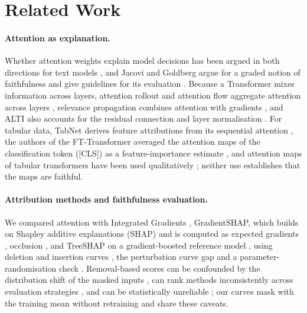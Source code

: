 \section{Related Work}
\label{sec:related}

\paragraph{Attention as explanation.}
Whether attention weights explain model decisions has been argued in both directions for text models
\cite{jain2019,wiegreffe2019,serrano2019}, and Jacovi and Goldberg argue for a graded notion of faithfulness and give
guidelines for its evaluation \cite{jacovi2020}.
Because a Transformer mixes information across layers, attention rollout and attention flow aggregate attention across
layers \cite{abnar2020}, relevance propagation combines attention with gradients \cite{chefer2021}, and ALTI also
accounts for the residual connection and layer normalisation \cite{ferrando2022}.
For tabular data, TabNet derives feature attributions from its sequential attention \cite{arik2021}, the authors of the
FT-Transformer averaged the attention maps of the classification token ([CLS]) as a feature-importance estimate
\cite{gorishniy2021}, and attention maps of tabular transformers have been used qualitatively \cite{somepalli2021};
neither use establishes that the maps are faithful.

\paragraph{Attribution methods and faithfulness evaluation.}
We compared attention with Integrated Gradients \cite{sundararajan2017}, GradientSHAP, which builds on Shapley additive explanations (SHAP) \cite{lundberg2017} and is computed as expected gradients \cite{erion2021},
occlusion \cite{zeiler2014}, and TreeSHAP on a gradient-boosted reference model \cite{lundberg2020}, using deletion and
insertion curves \cite{petsiuk2018,samek2017}, the perturbation curve gap \cite{samek2017} and a parameter-randomisation
check \cite{adebayo2018}.
Removal-based scores can be confounded by the distribution shift of the masked inputs \cite{hooker2019}, can rank
methods inconsistently across evaluation strategies \cite{rong2022}, and can be statistically unreliable
\cite{tomsett2020}; our curves mask with the training mean without retraining and share these caveats.

